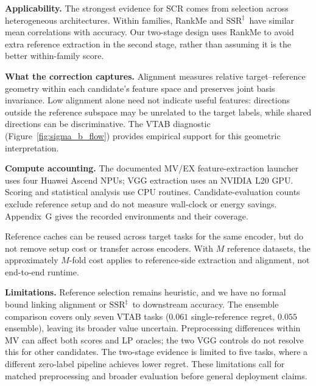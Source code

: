 \documentclass{article}
\newcommand{\SSRdag}{\ensuremath{\mathrm{SSR}^{\ddagger}}\xspace}
\begin{document}
\textbf{Applicability.} The strongest evidence for SCR comes from selection across heterogeneous architectures. Within families, RankMe and \SSRdag\ have similar mean correlations with accuracy. Our two-stage design uses RankMe to avoid extra reference extraction in the second stage, rather than assuming it is the better within-family score.

\textbf{What the correction captures.} Alignment measures relative target--reference geometry within each candidate's feature space and preserves joint basis invariance. Low alignment alone need not indicate useful features: directions outside the reference subspace may be unrelated to the target labels, while shared directions can be discriminative. The VTAB diagnostic (Figure~\ref{fig:sigma_b_flow}) provides empirical support for this geometric interpretation.

\textbf{Compute accounting.} The documented MV/EX feature-extraction launcher uses four Huawei Ascend NPUs; VGG extraction uses an NVIDIA L20 GPU. Scoring and statistical analysis use CPU routines. Candidate-evaluation counts exclude reference setup and do not measure wall-clock or energy savings. Appendix~G gives the recorded environments and their coverage.

Reference caches can be reused across target tasks for the same encoder, but do not remove setup cost or transfer across encoders. With $M$ reference datasets, the approximately $M$-fold cost applies to reference-side extraction and alignment, not end-to-end runtime.

\textbf{Limitations.} Reference selection remains heuristic, and we have no formal bound linking alignment or \SSRdag\ to downstream accuracy. The ensemble comparison covers only seven VTAB tasks ($0.061$ single-reference regret, $0.055$ ensemble), leaving its broader value uncertain. Preprocessing differences within MV can affect both scores and LP oracles; the two VGG controls do not resolve this for other candidates. The two-stage evidence is limited to five tasks, where a different zero-label pipeline achieves lower regret. These limitations call for matched preprocessing and broader evaluation before general deployment claims.
\end{document}
